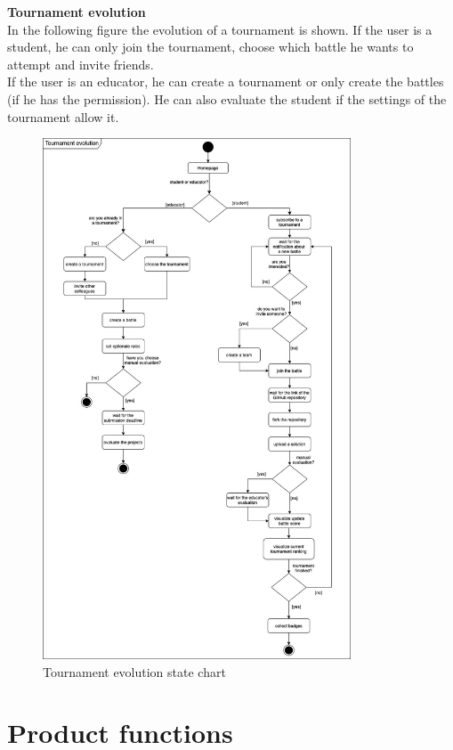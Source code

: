 \clearpage
\textbf{Tournament evolution}\\
In the following figure the evolution of a tournament is shown. If the user is a student, he can only join
the tournament, choose which battle he wants to attempt and invite friends.\\ If the user is an educator, he
can create a tournament or only create the battles (if he has the permission). He can also evaluate 
the student if the settings of the tournament allow it.
\begin{figure} [H]
  \centering
  \includegraphics[width=0.815\textwidth]{images/state_diagrams/Tournament_evolution.jpg}
  \caption{Tournament evolution state chart}
\end{figure} \vspace{1cm}

\section{Product functions}
